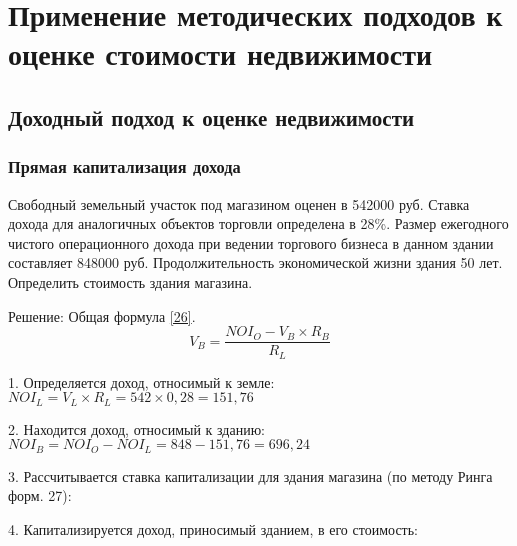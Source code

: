 \section{Применение методических подходов к оценке стоимости недвижимости}
\subsection{Доходный подход к оценке недвижимости}
\subsubsection{Прямая капитализация дохода}

Свободный земельный участок под магазином оценен в 542000 руб. 
Ставка дохода для аналогичных объектов торговли определена в 28\%.
Размер ежегодного чистого операционного дохода при ведении торгового бизнеса в данном здании составляет 848000 руб.
Продолжительность экономической жизни здания 50 лет.
Определить стоимость здания магазина.

Решение: Общая формула \ref{26}.
\begin{equation}\label{26}
V_B = \dfrac{NOI_O - V_B \times R_B}{R_L}
\end{equation}

1. Определяется доход, относимый к земле:
$ NOI_L = V_L \times R_L = 542 \times 0,28 = 151,76 $

2. Находится доход, относимый к зданию:
$ NOI_B = NOI_O - NOI_L = 848 - 151,76 =696,24 $

3. Рассчитывается ставка капитализации для здания магазина (по методу Ринга форм. 27):

4. Капитализируется доход, приносимый зданием, в его стоимость:
